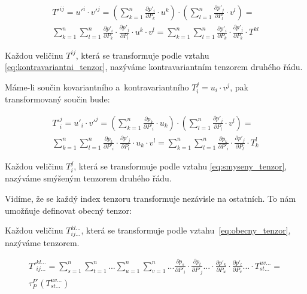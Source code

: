 \begin{equation}
\label{eq:kontravariantni_tenzor}
\begin{split}
T'^{ij} = u'^i \cdot v'^j = (\sum_{k=1}^n \frac{\partial p'_i}{\partial P_k} \cdot u^k) \cdot (\sum_{l=1}^n \frac{\partial p'_j}{\partial P_l} \cdot v^l) = \\
\sum_{k=1}^n \sum_{l=1}^n \frac{\partial p'_i}{\partial P_k} \cdot \frac{\partial p'_j}{\partial P_l} \cdot u^k \cdot v^l = \sum_{k=1}^n \sum_{l=1}^n \frac{\partial p'_i}{\partial P_k} \cdot \frac{\partial p'_j}{\partial P_k} \cdot T^{kl}\end{split}
\end{equation}

Každou veličinu \(T^{ij}\), která se transformuje podle vztahu \eqref{eq:kontravariantni_tenzor}, nazýváme kontravariantním tenzorem druhého řádu.

Máme-li součin kovariantního a~kontravariantního \(T_i^j = u_i \cdot v^j\), pak transformovaný součin bude:

\begin{equation}
\label{eq:smyseny_tenzor}
\begin{split}
T'^j_i = u'_i \cdot v'^j = (\sum_{k=1}^n \frac{\partial p_k}{\partial P'_i} \cdot u_k) \cdot (\sum_{l=1}^n \frac{\partial p'_j}{\partial P_l} \cdot v^l) = \\
\sum_{k=1}^n \sum_{l=1}^n \frac{\partial p_k}{\partial P'_i} \cdot \frac{\partial p'_j}{\partial P_l} \cdot u_k \cdot v^l = \sum_{k=1}^n \sum_{l=1}^n \frac{\partial p_k}{\partial P'_i} \cdot \frac{\partial p'_j}{\partial P_l} \cdot T_k^l
\end{split}
\end{equation}

Každou veličinu \(T_i^j\), která se transformuje podle vztahu \eqref{eq:smyseny_tenzor}, nazýváme smýšeným tenzorem druhého řádu.

Vidíme, že se každý index tenzoru transformuje nezávisle na ostatních. To nám umožňuje definovat obecný tenzor:

\begin{fact}

Každou veličinu \(T_{ij...}^{kl...}\), která se transformuje podle vztahu~\eqref{eq:obecny_tenzor}, nazýváme tenzorem.

\begin{equation}
\label{eq:obecny_tenzor}
\begin{split}
T'^{kl...}_{ij...} = \sum_{s=1}^n \sum_{t=1}^n ... \sum_{u=1}^n \sum_{v=1}^n ... \frac{\partial p_s}{\partial P'_i} \cdot \frac{\partial p_t}{\partial P'_j} ... \cdot \frac{\partial p'_k}{\partial P_u} \cdot \frac{\partial p'_l}{\partial P_v} ... \cdot T_{st...}^{uv...} = \\
\tau_{P}^{P'} (T_{st...}^{uv...})
\end{split}
\end{equation}

\end{fact}

